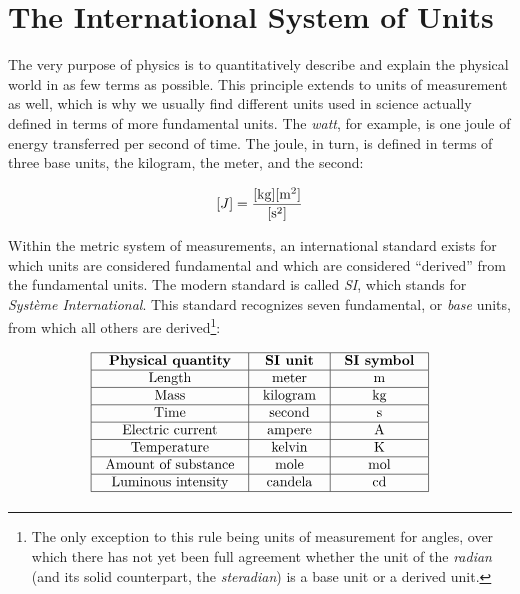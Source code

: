 \filbreak
\section{The International System of Units}

The very purpose of physics is to quantitatively describe and explain the physical world in as few terms as possible.  This principle extends to units of measurement as well, which is why we usually find different units used in science actually defined in terms of more fundamental units.  The \textit{watt}, for example, is one joule of energy transferred per second of time.  The joule, in turn, is defined in terms of three base units, the kilogram, the meter, and the second:

$$[J] = {[\hbox{kg}][\hbox{m}^2] \over [\hbox{s}^2]}$$

Within the metric system of measurements, an international standard exists for which units are considered fundamental and which are considered ``derived'' from the fundamental units.  The modern standard is called \textit{SI}, which stands for \textit{Syst\`eme International}.  This standard recognizes seven fundamental, or \textit{base} units, from which all others are derived\footnote{The only exception to this rule being units of measurement for angles, over which there has not yet been full agreement whether the unit of the \textit{radian} (and its solid counterpart, the \textit{steradian}) is a base unit or a derived unit.}:    


$$\vbox{\offinterlineskip
\halign{\strut
\vrule \quad\hfil # \ \hfil & 
\vrule \quad\hfil # \ \hfil & 
\vrule \quad\hfil # \ \hfil \vrule \cr
\noalign{\hrule}
%
\textbf{Physical quantity} & \textbf{SI unit} & \textbf{SI symbol} \cr
%
\noalign{\hrule}
%
Length & meter & m \cr
%
\noalign{\hrule}
%
Mass & kilogram & kg \cr
%
\noalign{\hrule}
%
Time & second & s \cr
%
\noalign{\hrule}
%
Electric current & ampere & A \cr
%
\noalign{\hrule}
%
Temperature & kelvin & K \cr
%
\noalign{\hrule}
%
Amount of substance & mole & mol \cr
%
\noalign{\hrule}
%
Luminous intensity & candela & cd \cr
%
\noalign{\hrule}
} %
}$$ %

